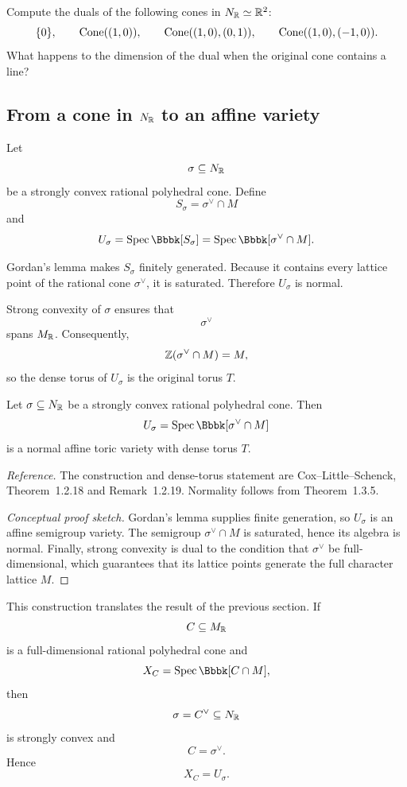 \begin{pauseandthink}
Compute the duals of the following cones in \(N_{\mathbb{R}}\simeq\mathbb{R}^2\):
\[
\{0\},
\qquad
\operatorname{Cone}((1,0)),
\qquad
\operatorname{Cone}((1,0),(0,1)),
\qquad
\operatorname{Cone}((1,0),(-1,0)).
\]
What happens to the dimension of the dual when the original cone
contains a line?
\end{pauseandthink}

\subsection{From a cone in \texorpdfstring{\(N_{\mathbb{R}}\)}{N\_R} to an affine variety}

Let
\[
\sigma\subseteq N_{\mathbb{R}}
\]
be a strongly convex rational polyhedral cone. Define
\[
S_\sigma
=
\sigma^\vee\cap M
\]
and
\[
U_\sigma
=
\Spec\Bbbk[S_\sigma]
=
\Spec\Bbbk[\sigma^\vee\cap M].
\]

Gordan's lemma makes \(S_\sigma\) finitely generated. Because it
contains every lattice point of the rational cone \(\sigma^\vee\), it
is saturated. Therefore \(U_\sigma\) is normal.

Strong convexity of \(\sigma\) ensures that
\[
\sigma^\vee
\]
spans \(M_{\mathbb{R}}\). Consequently,
\[
\mathbb{Z}(\sigma^\vee\cap M)=M,
\]
so the dense torus of \(U_\sigma\) is the original torus \(T\).

\begin{theorem}
\label{thm:affine-toric-variety-from-N-cone}
Let \(\sigma\subseteq N_{\mathbb{R}}\) be a strongly convex rational
polyhedral cone. Then
\[
U_\sigma
=
\Spec\Bbbk[\sigma^\vee\cap M]
\]
is a normal affine toric variety with dense torus \(T\).
\end{theorem}

\noindent
\textit{Reference.}
The construction and dense-torus statement are
Cox--Little--Schenck, Theorem~1.2.18 and Remark~1.2.19.
Normality follows from Theorem~1.3.5.

\begin{proof}[Conceptual proof sketch]
Gordan's lemma supplies finite generation, so \(U_\sigma\) is an
affine semigroup variety. The semigroup
\(\sigma^\vee\cap M\) is saturated, hence its algebra is normal.
Finally, strong convexity is dual to the condition that
\(\sigma^\vee\) be full-dimensional, which guarantees that its lattice
points generate the full character lattice \(M\).
\end{proof}

This construction translates the result of the previous section. If
\[
C\subseteq M_{\mathbb{R}}
\]
is a full-dimensional rational polyhedral cone and
\[
X_C=\Spec\Bbbk[C\cap M],
\]
then
\[
\sigma=C^\vee\subseteq N_{\mathbb{R}}
\]
is strongly convex and
\[
C=\sigma^\vee.
\]
Hence
\[
X_C=U_\sigma.
\]

